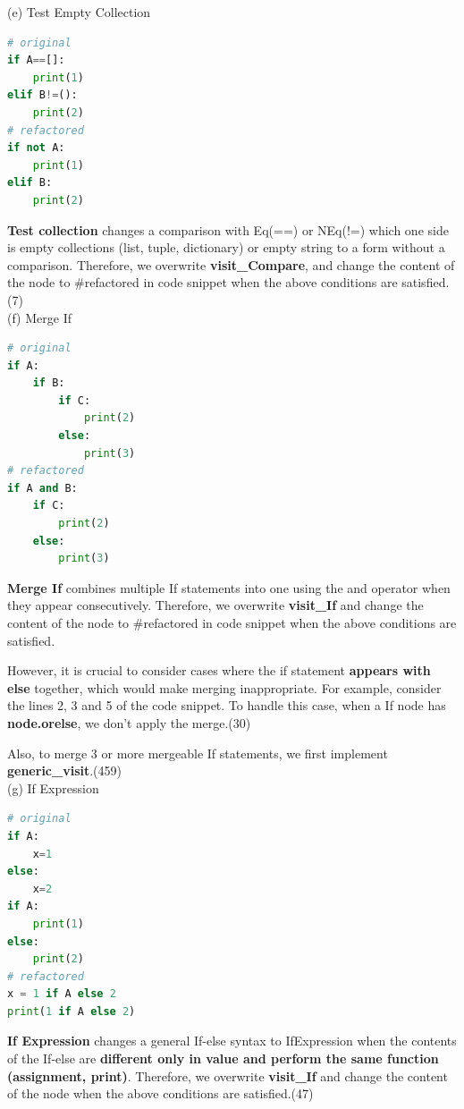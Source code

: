 \documentclass[11pt]{article}
\begin{document}
(e) Test Empty Collection
\begin{lstlisting}[language=python]
# original
if A==[]:
    print(1)
elif B!=():
    print(2)
# refactored
if not A:
    print(1)
elif B:
    print(2)
\end{lstlisting}

\textbf{Test collection} changes a comparison with Eq(==) or NEq(!=) which one side is empty collections (list, tuple, dictionary) or empty string to a form without a comparison. Therefore, we overwrite \textbf{visit\_Compare}, and change the content of the node to \#refactored in code snippet when the above conditions are satisfied.(7)\\

(f) Merge If
\begin{lstlisting}[language=python]
# original
if A:
    if B:
		if C:
        	print(2)
		else:
			print(3)
# refactored
if A and B:
	if C:
    	print(2)
	else:
		print(3)
\end{lstlisting}

\textbf{Merge If} combines multiple If statements into one using the and operator when they appear consecutively. Therefore, we overwrite \textbf{visit\_If} and change the content of the node to \#refactored in code snippet when the above conditions are satisfied.

However, it is crucial to consider cases where the if statement \textbf{appears with else} together, which would make merging inappropriate. For example, consider the lines 2, 3 and 5 of the code snippet. To handle this case, when a If node has \textbf{node.orelse}, we don't apply the merge.(30)

Also, to merge 3 or more mergeable If statements, we first implement \textbf{generic\_visit}.(459)\\

(g) If Expression
\begin{lstlisting}[language=python]
# original
if A:
    x=1
else:
    x=2
if A:
    print(1)
else:
    print(2)
# refactored
x = 1 if A else 2
print(1 if A else 2)
\end{lstlisting}

\textbf{If Expression} changes a general If-else syntax to IfExpression when the contents of the If-else are \textbf{different only in value and perform the same function (assignment, print)}. Therefore, we overwrite \textbf{visit\_If} and change the content of the node when the above conditions are satisfied.(47)\\
\end{document}
